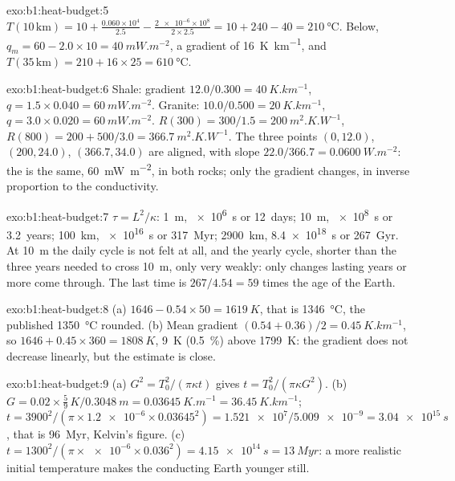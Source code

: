 \begin{solution}{exo:b1:heat-budget:5}
$T(10\,\text{km}) = 10 + \frac{0.060\times10^4}{2.5} - \frac{\num{2e-6}\times10^8}{2\times2.5}
= 10 + 240 - 40 = \qty{210}{\degreeCelsius}$. Below, $q_m = 60 - 2.0\times10 =
\qty{40}{mW.m^{-2}}$, a gradient of \qty{16}{K.km^{-1}}, and
$T(35\,\text{km}) = 210 + 16\times25 = \qty{610}{\degreeCelsius}$.
\end{solution}

\begin{solution}{exo:b1:heat-budget:6}
Shale: gradient $12.0/0.300 = \qty{40}{K.km^{-1}}$, $q = 1.5\times0.040 =
\qty{60}{mW.m^{-2}}$. Granite: $10.0/0.500 = \qty{20}{K.km^{-1}}$,
$q = 3.0\times0.020 = \qty{60}{mW.m^{-2}}$. $R(300) = 300/1.5 =
\qty{200}{m^2.K.W^{-1}}$, $R(800) = 200 + 500/3.0 = \qty{366.7}{m^2.K.W^{-1}}$.
The three points $(0, 12.0)$, $(200, 24.0)$, $(366.7, 34.0)$ are aligned, with
slope $22.0/366.7 = \qty{0.0600}{W.m^{-2}}$: the  is the same,
\qty{60}{mW.m^{-2}}, in both rocks; only the gradient changes, in inverse
proportion to the conductivity.
\end{solution}

\begin{solution}{exo:b1:heat-budget:7}
$\tau = L^2/\kappa$: \qty{1}{m}, \qty{e6}{s} or \num{12}~days; \qty{10}{m},
\qty{e8}{s} or \num{3.2}~years; \qty{100}{km}, \qty{e16}{s} or
\qty{317}{Myr}; \qty{2900}{km}, \qty{8.4e18}{s} or \qty{267}{Gyr}. At
\qty{10}{m} the daily cycle is not felt at all, and the yearly cycle, shorter
than the three years needed to cross \qty{10}{m}, only very weakly: only changes
lasting years or more come through. The last time is $267/4.54 = 59$ times the
age of the Earth.
\end{solution}

\begin{solution}{exo:b1:heat-budget:8}
(a) $1646 - 0.54\times50 = \qty{1619}{K}$, that is \qty{1346}{\degreeCelsius},
the published \qty{1350}{\degreeCelsius} rounded. (b) Mean gradient
$(0.54 + 0.36)/2 = \qty{0.45}{K.km^{-1}}$, so $1646 + 0.45\times360 =
\qty{1808}{K}$, \qty{9}{K} (\qty{0.5}{\percent}) above \qty{1799}{K}: the
gradient does not decrease linearly, but the estimate is close.
\end{solution}

\begin{solution}{exo:b1:heat-budget:9}
(a) $G^2 = T_0^2/(\pi\kappa t)$ gives $t = T_0^2/(\pi\kappa G^2)$.
(b) $G = 0.02\times\tfrac59\,\unit{K}/\qty{0.3048}{m} = \qty{0.03645}{K.m^{-1}} =
\qty{36.45}{K.km^{-1}}$; $t = 3900^2/(\pi\times\num{1.2e-6}\times0.03645^2) =
\num{1.521e7}/\num{5.009e-9} = \qty{3.04e15}{s}$, that is \qty{96}{Myr},
Kelvin's figure. (c) $t = 1300^2/(\pi\times\num{e-6}\times0.036^2) =
\qty{4.15e14}{s} = \qty{13}{Myr}$: a more realistic initial temperature makes
the conducting Earth younger still.
\end{solution}

